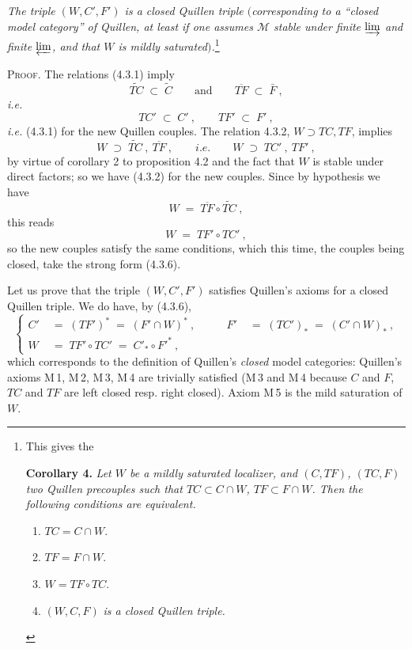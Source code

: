 \documentclass[11pt]{article}
\newcommand{\printedpage}[1]{\marginpar{\footnotesize p.~#1}}
\newcommand{\msp}[1]{\marginpar{\footnotesize [#1]}}
\begin{document}
\msp{page 36}
\textit{The triple $(W,C',F')$ is a closed Quillen triple $($corresponding to a ``closed model category'' of Quillen, at least if one assumes $\mathcal{M}$ stable under finite $\varinjlim$ and finite $\varprojlim$, and that $W$ is mildly saturated$)$.}\footnote[13]{This gives the\par
\textbf{Corollary 4.} \textit{Let $W$ be a mildly saturated localizer, and $(C,TF)$, $(TC,F)$ two Quillen precouples such that $TC\subset C\cap W$, $TF\subset F\cap W$. Then the following conditions are equivalent.}
\begin{enumerate}[leftmargin=*]
\item[a)] $TC=C\cap W$.
\item[b)] $TF=F\cap W$.
\item[c)] $W=TF\circ TC$.
\item[d)] $(W,C,F)$ \textit{is a closed Quillen triple.}
\end{enumerate}}

\textsc{Proof.} The relations (4.3.1) imply
\[
\widetilde{TC}\;\subset\;\widetilde{C}\qquad\text{and}\qquad\overline{TF}\;\subset\;\bar{F}\ ,
\]
\printedpage{25}
\textit{i.e.}
\[
TC'\;\subset\;C'\ ,\qquad TF'\;\subset\;F'\ ,
\]
\textit{i.e.} (4.3.1) for the new Quillen couples. The relation 4.3.2, $W\supset TC,TF$, implies
\[
W\;\supset\;\widetilde{TC}\ ,\ \overline{TF}\ ,\qquad \textit{i.e.}\qquad W\;\supset\;TC'\ ,\ TF'\ ,
\]
by virtue of corollary 2 to proposition 4.2 and the fact that $W$ is stable under direct factors; so we have (4.3.2) for the new couples. Since by hypothesis we have
\[
W\;=\;\overline{TF}\circ\widetilde{TC}\ ,
\]
this reads
\[
W\;=\;TF'\circ TC'\ ,
\]
so the new couples satisfy the same conditions, which this time, the couples being closed, take the strong form (4.3.6).

Let us prove that the triple $(W,C',F')$ satisfies Quillen's axioms for a closed Quillen triple. We do have, by (4.3.6),
\[
\left\{
\begin{aligned}
C' &\;=\;(TF')^*\;=\;(F'\cap W)^*\ , &\qquad F' &\;=\;(TC')_*\;=\;(C'\cap W)_*\ ,\\
W &\;=\;TF'\circ TC'\;=\;C'_*\circ F'^*\ ,
\end{aligned}
\right.
\]
which corresponds to the definition of Quillen's \textit{closed} model categories: Quillen's axioms M\,1, M\,2, M\,3, M\,4 are trivially satisfied (M\,3 and M\,4 because
\msp{page 37}
$C$ and $F$, $TC$ and $TF$ are left closed resp. right closed). Axiom M\,5 is the mild saturation of $W$.
\end{document}
